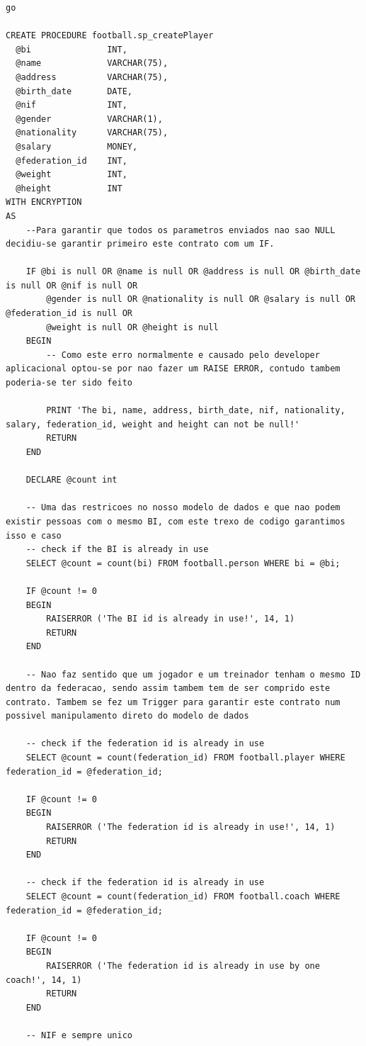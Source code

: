 \documentclass[pdftex,12pt,a4paper]{report}
\begin{document}
\begin{lstlisting}
go 

CREATE PROCEDURE football.sp_createPlayer
  @bi				INT, 
  @name				VARCHAR(75),
  @address			VARCHAR(75), 
  @birth_date		DATE, 
  @nif				INT, 
  @gender			VARCHAR(1), 
  @nationality		VARCHAR(75),
  @salary			MONEY,
  @federation_id	INT,
  @weight			INT,
  @height			INT
WITH ENCRYPTION
AS 
	--Para garantir que todos os parametros enviados nao sao NULL decidiu-se garantir primeiro este contrato com um IF.
	 
	IF @bi is null OR @name is null OR @address is null OR @birth_date is null OR @nif is null OR 
		@gender is null OR @nationality is null OR @salary is null OR @federation_id is null OR
		@weight is null OR @height is null
	BEGIN
		-- Como este erro normalmente e causado pelo developer aplicacional optou-se por nao fazer um RAISE ERROR, contudo tambem poderia-se ter sido feito
		
		PRINT 'The bi, name, address, birth_date, nif, nationality, salary, federation_id, weight and height can not be null!'
		RETURN
	END
	
	DECLARE @count int

	-- Uma das restricoes no nosso modelo de dados e que nao podem existir pessoas com o mesmo BI, com este trexo de codigo garantimos isso e caso 
	-- check if the BI is already in use
	SELECT @count = count(bi) FROM football.person WHERE bi = @bi;

	IF @count != 0
	BEGIN
		RAISERROR ('The BI id is already in use!', 14, 1)
		RETURN
	END
		
	-- Nao faz sentido que um jogador e um treinador tenham o mesmo ID dentro da federacao, sendo assim tambem tem de ser comprido este contrato. Tambem se fez um Trigger para garantir este contrato num possivel manipulamento direto do modelo de dados
	
	-- check if the federation id is already in use
	SELECT @count = count(federation_id) FROM football.player WHERE federation_id = @federation_id;

	IF @count != 0
	BEGIN
		RAISERROR ('The federation id is already in use!', 14, 1)
		RETURN
	END
	
	-- check if the federation id is already in use
	SELECT @count = count(federation_id) FROM football.coach WHERE federation_id = @federation_id;

	IF @count != 0
	BEGIN
		RAISERROR ('The federation id is already in use by one coach!', 14, 1)
		RETURN
	END
	
	-- NIF e sempre unico
	

\end{lstlisting}
\end{document}
